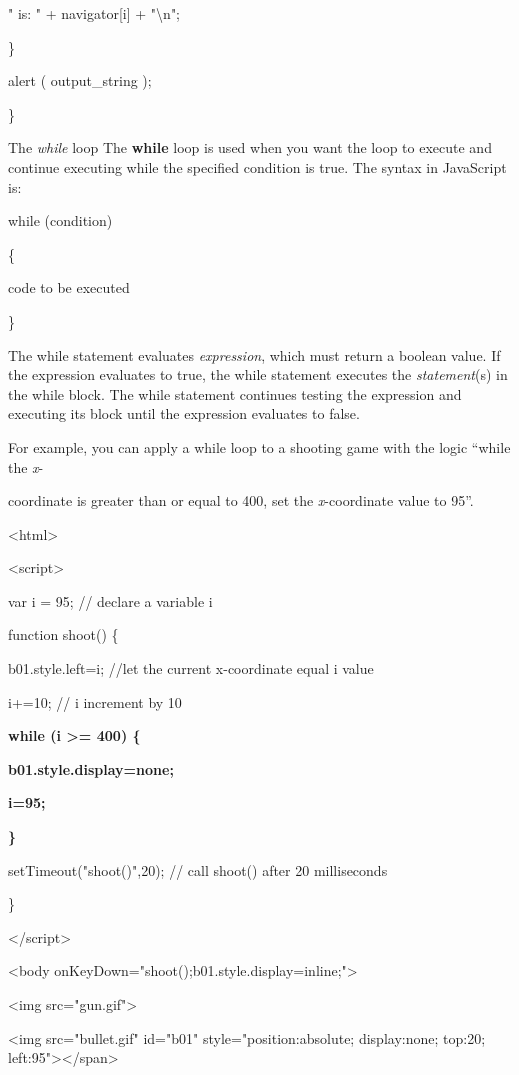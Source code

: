 \documentclass[
]{article}
\begin{document}
" is: " + navigator{[}i{]} + "\textbackslash n";

\}

alert ( output\_string );

\}

The \emph{while} loop The \textbf{while} loop is used when you want the
loop to execute and continue executing while the specified condition is
true. The syntax in JavaScript is:

while (condition)

\{

code to be executed

\}

The while statement evaluates \emph{expression}, which must return a
boolean value. If the expression evaluates to true, the while statement
executes the \emph{statement}(s) in the while block. The while statement
continues testing the expression and executing its block until the
expression evaluates to false.

For example, you can apply a while loop to a shooting game with the
logic ``while the \emph{x}-

coordinate is greater than or equal to 400, set the \emph{x}-coordinate
value to 95''.

\textless html\textgreater{}

\textless script\textgreater{}

var i = 95; // declare a variable i

function shoot() \{

b01.style.left=i; //let the current x-coordinate equal i value

i+=10; // i increment by 10

\textbf{while (i \textgreater= 400) \{}

\textbf{b01.style.display=\textquotesingle none\textquotesingle;}

\textbf{i=95;}

\textbf{\}}

setTimeout("shoot()",20); // call shoot() after 20 milliseconds

\}

\textless/script\textgreater{}

\textless body
onKeyDown="shoot();b01.style.display=\textquotesingle inline\textquotesingle;"\textgreater{}

\textless img src="gun.gif"\textgreater{}

\textless img src="bullet.gif" id="b01" style="position:absolute;
display:none; top:20; left:95"\textgreater\textless/span\textgreater{}
\end{document}
